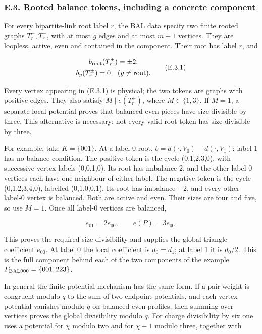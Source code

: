\documentclass[english,11pt,a4paper]{article}
\begin{document}
\subsubsection{E.3. Rooted balance tokens, including a concrete component}\label{e.3.-rooted-balance-tokens-including-a-concrete-component}

For every bipartite-link root label \(r\), the BAL data specify two finite rooted graphs \(T_r^+,T_r^-\), with at most \(g\) edges and at most \(m+1\) vertices. They are loopless, active, even and contained in the component. Their root has label \(r\), and

\[\begin{gathered}
b_{\rm root}(T_r^\pm)=\pm2,\\
b_y(T_r^\pm)=0\quad(y\ne\text{root}).
\end{gathered}
\tag{E.3.1}\]

Every vertex appearing in (E.3.1) is physical; the two tokens are graphs with positive edges. They also satisfy \(M\mid e(T_r^\pm)\), where \(M\in\{1,3\}\). If \(M=1\), a separate local potential proves that balanced even pieces have size divisible by three. This alternative is necessary: not every valid root token has size divisible by three.

For example, take \(K=\{001\}\). At a label-0 root, \(b=d(\cdot,V_0)-d(\cdot,V_1)\); label 1 has no balance condition. The positive token is the cycle (0,1,2,3,0), with successive vertex labels (0,0,1,0). Its root has imbalance 2, and the other label-0 vertices each have one neighbour of either label. The negative token is the cycle (0,1,2,3,4,0), labelled (0,1,0,0,1). Its root has imbalance \(-2\), and every other label-0 vertex is balanced. Both are active and even. Their sizes are four and five, so use \(M=1\). Once all label-0 vertices are balanced,

\[e_{01}=2e_{00},\qquad e(P)=3e_{00}.
\tag{E.3.2}\]

This proves the required size divisibility and supplies the global triangle coefficient \(e_{00}\). At label 0 the local coefficient is \(d_0=d_1\); at label 1 it is \(d_0/2\). This is the full component behind each of the two components of the example \(F_{\rm BAL000}=\{001,223\}\).

In general the finite potential mechanism has the same form. If a pair weight is congruent modulo \(q\) to the sum of two endpoint potentials, and each vertex potential vanishes modulo \(q\) on balanced even profiles, then summing over vertices proves the global divisibility modulo \(q\). For charge divisibility by six one uses a potential for \(\chi\) modulo two and for \(\chi-1\) modulo three, together with
\end{document}
